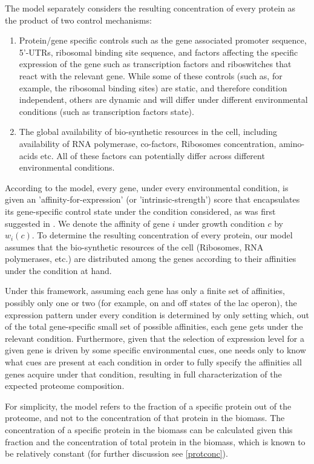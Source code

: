 \documentclass[a4paper]{article}
\begin{document}
The model separately considers the resulting concentration of every protein as the product of two control mechanisms:
\begin{enumerate}
\item Protein/gene specific controls such as the gene associated promoter sequence, 5'-UTRs, ribosomal binding site sequence, and factors affecting the specific expression of the gene such as transcription factors and riboswitches that react with the relevant gene.
  While some of these controls (such as, for example, the ribosomal binding sites) are static, and therefore condition independent, others are dynamic and will differ under different environmental conditions (such as transcription factors state).
\item The global availability of bio-synthetic resources in the cell, including availability of RNA polymerase, co-factors, Ribosomes concentration, amino-acids etc.
  All of these factors can potentially differ across different environmental conditions.
\end{enumerate}


According to the model, every gene, under every environmental condition, is given an 'affinity-for-expression' (or 'intrinsic-strength') score that encapsulates its gene-specific control state under the condition considered, as was first suggested in \cite{Maaloe1969}.
We denote the affinity of gene $i$ under growth condition $c$ by $w_i(c)$.
To determine the resulting concentration of every protein, our model assumes that the bio-synthetic resources of the cell (Ribosomes, RNA polymerases, etc.) are distributed among the genes according to their affinities under the condition at hand.

Under this framework, assuming each gene has only a finite set of affinities, possibly only one or two (for example, on and off states of the lac operon), the expression pattern under every condition is determined by only setting which, out of the total gene-specific small set of possible affinities, each gene gets under the relevant condition.
Furthermore, given that the selection of expression level for a given gene is driven by some specific environmental cues, one needs only to know what cues are present at each condition in order to fully specify the affinities all genes acquire under that condition, resulting in full characterization of the expected proteome composition.


For simplicity, the model refers to the fraction of a specific protein out of the proteome, and not to the concentration of that protein in the biomass.
The concentration of a specific protein in the biomass can be calculated given this fraction and the concentration of total protein in the biomass, which is known to be relatively constant \cite{Bremer1987,Scott2014} (for further discussion see \ref{protconc}).
\end{document}
